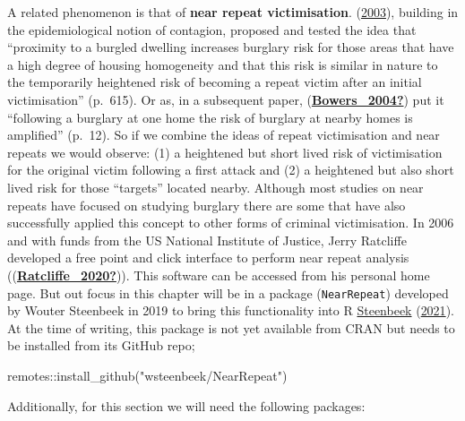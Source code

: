 \documentclass[
  krantz2]{krantz}
\makeatletter
\newenvironment{Shaded}{\begin{snugshade}}{\end{snugshade}}
\newcommand{\FunctionTok}[1]{\textcolor[rgb]{0,0,0}{#1}}
\newcommand{\NormalTok}[1]{#1}
\newcommand{\SpecialCharTok}[1]{\textcolor[rgb]{0,0,0}{#1}}
\newcommand{\StringTok}[1]{\textcolor[rgb]{0.5,0.5,0.5}{#1}}
\newenvironment{kframe}{%
\medskip{}
\setlength{\fboxsep}{.8em}
 \def\at@end@of@kframe{}%
 \ifinner\ifhmode%
  \def\at@end@of@kframe{\end{minipage}}%
  \begin{minipage}{\columnwidth}%
 \fi\fi%
 \def\FrameCommand##1{\hskip\@totalleftmargin \hskip-\fboxsep
 \colorbox{shadecolor}{##1}\hskip-\fboxsep
     \hskip-\linewidth \hskip-\@totalleftmargin \hskip\columnwidth}%
 \MakeFramed {\advance\hsize-\width
   \@totalleftmargin\z@ \linewidth\hsize
   \@setminipage}}%
 {\par\unskip\endMakeFramed%
 \at@end@of@kframe}
\renewenvironment{Shaded}{\begin{kframe}}{\end{kframe}}
\makeatother
\begin{document}
A related phenomenon is that of \textbf{near repeat victimisation}. (\protect\hyperlink{ref-Townsley_2003}{2003}), building in the epidemiological notion of contagion, proposed and tested the idea that ``proximity to a burgled dwelling increases burglary risk for those areas that have a high degree of housing homogeneity and that this risk is similar in nature to the temporarily heightened risk of becoming a repeat victim after an initial victimisation'' (p.~615). Or as, in a subsequent paper, (\protect\hyperlink{ref-Bowers_2004}{\textbf{Bowers\_2004?}}) put it ``following a burglary at one home the risk of burglary at nearby homes is amplified'' (p.~12). So if we combine the ideas of repeat victimisation and near repeats we would observe: (1) a heightened but short lived risk of victimisation for the original victim following a first attack and (2) a heightened but also short lived risk for those ``targets'' located nearby. Although most studies on near repeats have focused on studying burglary there are some that have also successfully applied this concept to other forms of criminal victimisation. In 2006 and with funds from the US National Institute of Justice, Jerry Ratcliffe developed a free point and click interface to perform near repeat analysis ((\protect\hyperlink{ref-Ratcliffe_2020}{\textbf{Ratcliffe\_2020?}})). This software can be accessed from his personal home page. But out focus in this chapter will be in a package (\texttt{NearRepeat}) developed by Wouter Steenbeek in 2019 to bring this functionality into R \protect\hyperlink{ref-Steenbeek_2021}{Steenbeek} (\protect\hyperlink{ref-Steenbeek_2021}{2021}). At the time of writing, this package is not yet available from CRAN but needs to be installed from its GitHub repo;

\begin{Shaded}
\begin{Highlighting}[]
\NormalTok{remotes}\SpecialCharTok{::}\FunctionTok{install\_github}\NormalTok{(}\StringTok{"wsteenbeek/NearRepeat"}\NormalTok{)}
\end{Highlighting}
\end{Shaded}

Additionally, for this section we will need the following packages:
\end{document}
